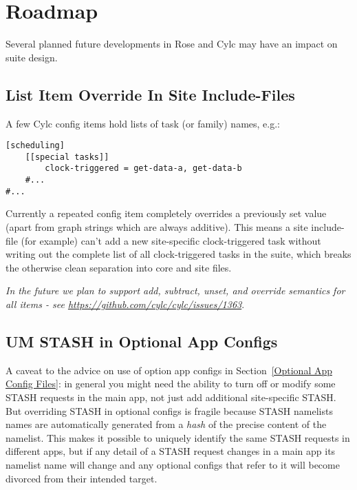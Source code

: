 \section{Roadmap}

Several planned future developments in Rose and Cylc may have an impact on
suite design.

\subsection{List Item Override In Site Include-Files}
\label{List Item Override In Site Include-Files}

A few Cylc config items hold lists of task (or family) names, e.g.:

\lstset{language=suiterc}
\begin{lstlisting}
[scheduling]
    [[special tasks]]
        clock-triggered = get-data-a, get-data-b
    #...
#...
\end{lstlisting}

Currently a repeated config item completely overrides a previously set value
(apart from graph strings which are always additive). This means a site
include-file (for example) can't add a new site-specific clock-triggered task
without writing out the complete list of all clock-triggered tasks in the
suite, which breaks the otherwise clean separation into core and site files.

{\em In the future we plan to support add, subtract, unset, and override
semantics for all items - see \url{https://github.com/cylc/cylc/issues/1363}}.

\subsection{UM STASH in Optional App Configs}
\label{UM STASH in Optional App Configs}

A caveat to the advice on use of option app configs in Section~\ref{Optional
App Config Files}: in general you might need the ability to turn off or modify
some STASH requests in the main app, not just add additional site-specific
STASH. But overriding STASH in optional configs is fragile because STASH
namelists names are automatically generated from a {\em hash} of the precise
content of the namelist. This makes it possible to uniquely identify the same
STASH requests in different apps, but if any detail of a STASH request changes
in a main app its namelist name will change and any optional configs that refer
to it will become divorced from their intended target.

